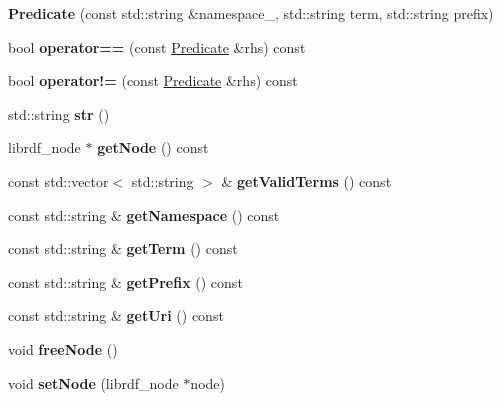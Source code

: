 \begin{DoxyCompactItemize}
\item 
\mbox{\label{classomexmeta_1_1Predicate_ad5a91eb29204202d2f18816d09677622}} 
{\bfseries Predicate} (const std\+::string \&namespace\+\_\+, std\+::string term, std\+::string prefix)
\item 
\mbox{\label{classomexmeta_1_1Predicate_a5db1e6150f8cfd7605e82996e2aebb50}} 
bool {\bfseries operator==} (const \hyperlink{classomexmeta_1_1Predicate}{Predicate} \&rhs) const
\item 
\mbox{\label{classomexmeta_1_1Predicate_a7bf4b8769eb9801eb26cc976723b56f2}} 
bool {\bfseries operator!=} (const \hyperlink{classomexmeta_1_1Predicate}{Predicate} \&rhs) const
\item 
\mbox{\label{classomexmeta_1_1Predicate_a9d51ebf565f39fb4d6d4f58c1b030edf}} 
std\+::string {\bfseries str} ()
\item 
\mbox{\label{classomexmeta_1_1Predicate_a144efc75a923b9d85b9f8eaccf0400bb}} 
librdf\+\_\+node $\ast$ {\bfseries get\+Node} () const
\item 
\mbox{\label{classomexmeta_1_1Predicate_aee19b8fc8b21f8e5ffd5b64691e1e530}} 
const std\+::vector$<$ std\+::string $>$ \& {\bfseries get\+Valid\+Terms} () const
\item 
\mbox{\label{classomexmeta_1_1Predicate_add4ab1cd86f83de3512279bbfdad947c}} 
const std\+::string \& {\bfseries get\+Namespace} () const
\item 
\mbox{\label{classomexmeta_1_1Predicate_a54a15176bd697d37d00573bf86954630}} 
const std\+::string \& {\bfseries get\+Term} () const
\item 
\mbox{\label{classomexmeta_1_1Predicate_a0147e977f71604db05763815ae6b553f}} 
const std\+::string \& {\bfseries get\+Prefix} () const
\item 
\mbox{\label{classomexmeta_1_1Predicate_a27fa7d62ad9a5182f3dd642bc61c8d9f}} 
const std\+::string \& {\bfseries get\+Uri} () const
\item 
\mbox{\label{classomexmeta_1_1Predicate_a718a37ff90ac0f2d7cc129e8351a2c7b}} 
void {\bfseries free\+Node} ()
\item 
\mbox{\label{classomexmeta_1_1Predicate_a0bf6030510247a6999d81cada92c1e51}} 
void {\bfseries set\+Node} (librdf\+\_\+node $\ast$node)
\end{DoxyCompactItemize}
